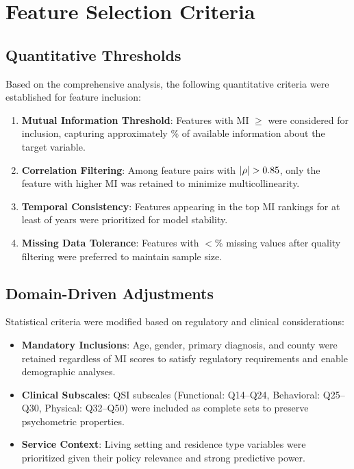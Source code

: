 \section{Feature Selection Criteria}
\label{sec:selection-criteria}

\subsection{Quantitative Thresholds}
\label{subsec:quantitative-thresholds}

Based on the comprehensive analysis, the following quantitative criteria were established for feature inclusion:

\begin{enumerate}
    \item \textbf{Mutual Information Threshold}: Features with MI $\geq$ \FSMIThreshold{} were considered for inclusion, capturing approximately \FSBootstrapStability\% of available information about the target variable.
    
    \item \textbf{Correlation Filtering}: Among feature pairs with $|\rho| > 0.85$, only the feature with higher MI was retained to minimize multicollinearity.
    
    \item \textbf{Temporal Consistency}: Features appearing in the top \FSTopTwentyThreshold{} MI rankings for at least \FSTemporalConsistencyYears{} of \FSNumFiscalYears{} years were prioritized for model stability.
    
    \item \textbf{Missing Data Tolerance}: Features with $<$\FSMissingDataThreshold\% missing values after quality filtering were preferred to maintain sample size.
\end{enumerate}

\subsection{Domain-Driven Adjustments}
\label{subsec:domain-adjustments}

Statistical criteria were modified based on regulatory and clinical considerations:

\begin{itemize}
    \item \textbf{Mandatory Inclusions}: Age, gender, primary diagnosis, and county were retained regardless of MI scores to satisfy regulatory requirements and enable demographic analyses.
    
    \item \textbf{Clinical Subscales}: QSI subscales (Functional: Q14--Q24, Behavioral: Q25--Q30, Physical: Q32--Q50) were included as complete sets to preserve psychometric properties.
    

    \item \textbf{Service Context}: Living setting and residence type variables were prioritized given their policy relevance and strong predictive power.
\end{itemize}




